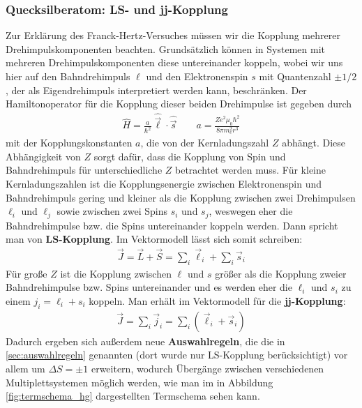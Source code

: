 \documentclass[11pt, a4paper]{article}
\begin{document}
\subsubsection{Quecksilberatom: LS- und jj-Kopplung}
Zur Erklärung des Franck-Hertz-Versuches müssen wir die Kopplung mehrerer Drehimpulskomponenten beachten.
Grundsätzlich können in Systemen mit mehreren Drehimpulskomponenten diese untereinander koppeln, wobei wir uns hier auf den Bahndrehimpuls $\ell$ und den Elektronenspin $s$ mit Quantenzahl $\pm1/2$, der als Eigendrehimpuls interpretiert werden kann, beschränken.
Der Hamiltonoperator für die Kopplung dieser beiden Drehimpulse ist gegeben durch
\begin{align*}
\hat{H}=\frac{a}{\hbar^2}\hat{\vec{\ell}}\cdot\hat{\vec{s}}\qquad a=\frac{Ze^2\mu_0\hbar^2}{8\pi m_e^2 r^3}
\end{align*}
mit der Kopplungskonstanten $a$, die von der Kernladungszahl $Z$ abhängt.
Diese Abhängigkeit von $Z$ sorgt dafür, dass die Kopplung von Spin und Bahndrehimpuls für unterschiedliche $Z$ betrachtet werden muss.
Für kleine Kernladungszahlen ist die Kopplungsenergie zwischen Elektronenspin und Bahndrehimpuls gering und kleiner als die Kopplung zwischen zwei Drehimpulsen $\ell_i$ und $\ell_j$ sowie zwischen zwei Spins $s_i$ und $s_j$, weswegen eher die Bahndrehimpulse bzw. die Spins untereinander koppeln werden.
Dann spricht man von \textbf{LS-Kopplung}.
Im Vektormodell lässt sich somit schreiben:
\begin{align*}
\vec{J}=\vec{L}+\vec{S}=\sum_i\vec{\ell}_i+\sum_i\vec{s}_i
\end{align*}
Für große $Z$ ist die Kopplung zwischen $\ell$ und $s$ größer als die Kopplung zweier Bahndrehimpulse bzw. Spins untereinander und es werden eher die $\ell_i$ und $s_i$ zu einem $j_i=\ell_i+s_i$ koppeln.
Man erhält im Vektormodell für die \textbf{jj-Kopplung}:
\begin{align*}
\vec{J}=\sum_i\vec{j}_i=\sum_i\left(\vec{\ell}_i+\vec{s}_i\right)
\end{align*}
Dadurch ergeben sich außerdem neue \textbf{Auswahlregeln}, die die in \ref{sec:auswahlregeln} genannten (dort wurde nur LS-Kopplung berücksichtigt) vor allem um $\Delta S=\pm1$ erweitern, wodurch Übergänge zwischen verschiedenen Multiplettsystemen möglich werden, wie man im in Abbildung \ref{fig:termschema_hg} dargestellten Termschema sehen kann.
\end{document}
